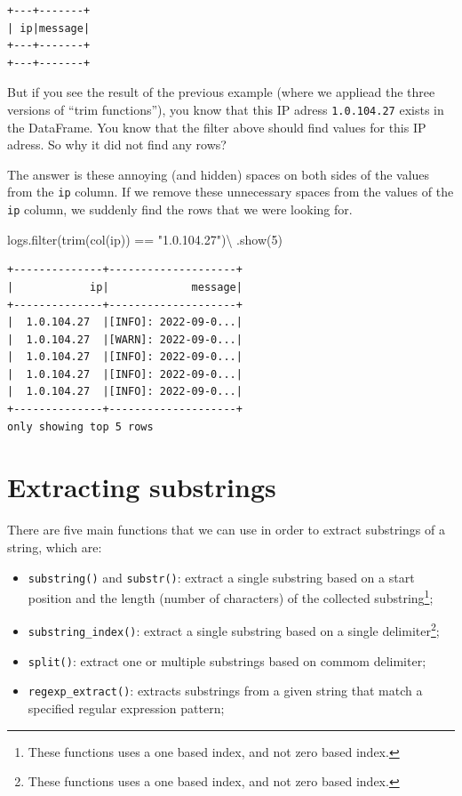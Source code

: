 \documentclass[
  11pt,
  letterpaper,
  DIV=11,
  numbers=noendperiod]{scrreprt}
\newenvironment{Shaded}{\begin{snugshade}}{\end{snugshade}}
\newcommand{\BuiltInTok}[1]{\textcolor[rgb]{0.00,0.23,0.31}{#1}}
\newcommand{\DecValTok}[1]{\textcolor[rgb]{0.68,0.00,0.00}{#1}}
\newcommand{\NormalTok}[1]{\textcolor[rgb]{0.00,0.23,0.31}{#1}}
\newcommand{\OperatorTok}[1]{\textcolor[rgb]{0.37,0.37,0.37}{#1}}
\newcommand{\StringTok}[1]{\textcolor[rgb]{0.13,0.47,0.30}{#1}}
\providecommand{\tightlist}{%
  \setlength{\itemsep}{0pt}\setlength{\parskip}{0pt}}\usepackage{longtable,booktabs,array}
\begin{document}
\begin{verbatim}
+---+-------+
| ip|message|
+---+-------+
+---+-------+
\end{verbatim}

But if you see the result of the previous example (where we appliead the
three versions of ``trim functions''), you know that this IP adress
\texttt{1.0.104.27} exists in the DataFrame. You know that the filter
above should find values for this IP adress. So why it did not find any
rows?

The answer is these annoying (and hidden) spaces on both sides of the
values from the \texttt{ip} column. If we remove these unnecessary
spaces from the values of the \texttt{ip} column, we suddenly find the
rows that we were looking for.

\begin{Shaded}
\begin{Highlighting}[]
\NormalTok{logs.}\BuiltInTok{filter}\NormalTok{(trim(col(}\StringTok{\textquotesingle{}ip\textquotesingle{}}\NormalTok{)) }\OperatorTok{==} \StringTok{"1.0.104.27"}\NormalTok{)}\OperatorTok{\textbackslash{}}
\NormalTok{    .show(}\DecValTok{5}\NormalTok{)}
\end{Highlighting}
\end{Shaded}

\begin{verbatim}
+--------------+--------------------+
|            ip|             message|
+--------------+--------------------+
|  1.0.104.27  |[INFO]: 2022-09-0...|
|  1.0.104.27  |[WARN]: 2022-09-0...|
|  1.0.104.27  |[INFO]: 2022-09-0...|
|  1.0.104.27  |[INFO]: 2022-09-0...|
|  1.0.104.27  |[INFO]: 2022-09-0...|
+--------------+--------------------+
only showing top 5 rows
\end{verbatim}

\hypertarget{extracting-substrings}{%
\section{Extracting substrings}\label{extracting-substrings}}

There are five main functions that we can use in order to extract
substrings of a string, which are:

\begin{itemize}
\tightlist
\item
  \texttt{substring()} and \texttt{substr()}: extract a single substring
  based on a start position and the length (number of characters) of the
  collected substring\footnote{These functions uses a one based index,
    and not zero based index.};
\item
  \texttt{substring\_index()}: extract a single substring based on a
  single delimiter\footnote{These functions uses a one based index, and
    not zero based index.};
\item
  \texttt{split()}: extract one or multiple substrings based on commom
  delimiter;
\item
  \texttt{regexp\_extract()}: extracts substrings from a given string
  that match a specified regular expression pattern;
\end{itemize}
\end{document}
